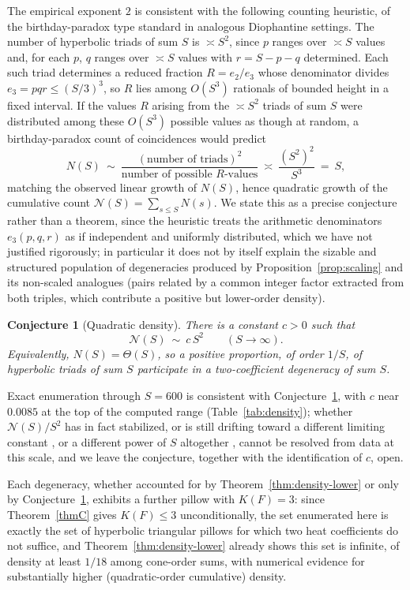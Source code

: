 \documentclass[12pt, letterpaper]{article}
\theoremstyle{definition}
\theoremstyle{plain}
\newtheorem{conjecture}[theorem]{Conjecture}
\begin{document}
The empirical exponent $2$ is consistent with the following counting heuristic, of the birthday-paradox type standard in analogous Diophantine settings. The number of hyperbolic triads of sum $S$ is $\asymp S^2$, since $p$ ranges over $\asymp S$ values and, for each $p$, $q$ ranges over $\asymp S$ values with $r=S-p-q$ determined. Each such triad determines a reduced fraction $R=e_2/e_3$ whose denominator divides $e_3=pqr\le(S/3)^3$, so $R$ lies among $O(S^3)$ rationals of bounded height in a fixed interval. If the values $R$ arising from the $\asymp S^2$ triads of sum $S$ were distributed among these $O(S^3)$ possible values as though at random, a birthday-paradox count of coincidences would predict
\[
    N(S)\ \sim\ \frac{(\text{number of triads})^2}{\text{number of possible }R\text{-values}}\ \asymp\ \frac{(S^2)^2}{S^3}\ =\ S,
\]
matching the observed linear growth of $N(S)$, hence quadratic growth of the cumulative count $\mathcal N(S)=\sum_{s\le S}N(s)$. We state this as a precise conjecture rather than a theorem, since the heuristic treats the arithmetic denominators $e_3(p,q,r)$ as if independent and uniformly distributed, which we have not justified rigorously; in particular it does not by itself explain the sizable and structured population of degeneracies produced by Proposition~\ref{prop:scaling} and its non-scaled analogues (pairs related by a common integer factor extracted from both triples, which contribute a positive but lower-order density).

\begin{conjecture}[Quadratic density]\label{conj:density}
There is a constant $c>0$ such that
\[
    \mathcal N(S)\ \sim\ c\,S^2\qquad(S\to\infty).
\]
Equivalently, $N(S)=\Theta(S)$, so a positive proportion, of order $1/S$, of hyperbolic triads of sum $S$ participate in a two-coefficient degeneracy of sum $S$.
\end{conjecture}

Exact enumeration through $S=600$ is consistent with Conjecture~\ref{conj:density}, with $c$ near $0.0085$ at the top of the computed range (Table~\ref{tab:density}); whether $\mathcal N(S)/S^2$ has in fact stabilized, or is still drifting toward a different limiting constant ,  or a different power of $S$ altogether ,  cannot be resolved from data at this scale, and we leave the conjecture, together with the identification of $c$, open.

Each degeneracy, whether accounted for by Theorem~\ref{thm:density-lower} or only by Conjecture~\ref{conj:density}, exhibits a further pillow with $K(F)=3$: since Theorem~\ref{thmC} gives $K(F)\le3$ unconditionally, the set enumerated here is exactly the set of hyperbolic triangular pillows for which two heat coefficients do not suffice, and Theorem~\ref{thm:density-lower} already shows this set is infinite, of density at least $1/18$ among cone-order sums, with numerical evidence for substantially higher (quadratic-order cumulative) density.
\end{document}
